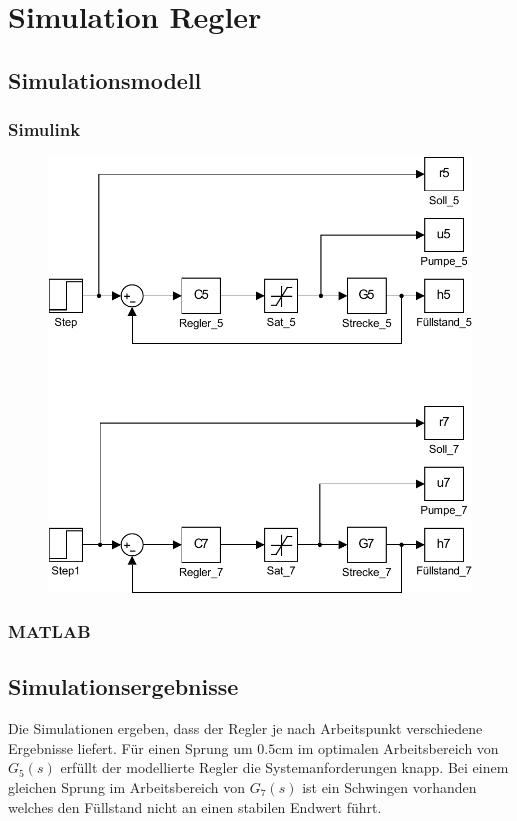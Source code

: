 \section{Simulation Regler}

\subsection{Simulationsmodell}

\subsubsection{Simulink}
\begin{figure}[h!]
	\centering
	\includegraphics[scale=0.8]{11/model.pdf}
\end{figure}

\subsubsection{MATLAB}

% 

\subsection{Simulationsergebnisse}
Die Simulationen ergeben, dass der Regler je nach Arbeitspunkt verschiedene
Ergebnisse liefert. Für einen Sprung um $0.5\si{\centi\meter}$ im optimalen
Arbeitsbereich von $G_5(s)$ erfüllt der modellierte Regler die
Systemanforderungen knapp. Bei einem gleichen Sprung im Arbeitsbereich
von $G_7(s)$ ist ein Schwingen vorhanden welches den Füllstand nicht
an einen stabilen Endwert führt.

